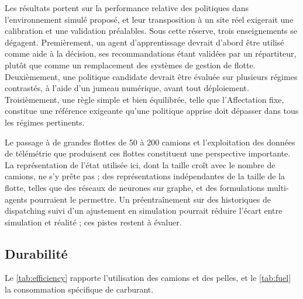 \documentclass[11pt,a4paper]{article}
\newif\ifrevmarks
\newcommand{\revtag}[1]{\ifrevmarks\textsuperscript{\textcolor{red!70!black}{\scriptsize[#1]}}\fi}
\newenvironment{revbloc}[1]{\par\ifrevmarks\color{revcolor}\noindent\revtag{#1}\ \fi}{\par}
\begin{document}
\begin{revbloc}{M27}
Les résultats portent sur la performance relative des politiques dans l'environnement simulé proposé, et leur transposition à un site réel exigerait une calibration et une validation préalables. Sous cette réserve, trois enseignements se dégagent. Premièrement, un agent d'apprentissage devrait d'abord être utilisé comme aide à la décision, ses recommandations étant validées par un répartiteur, plutôt que comme un remplacement des systèmes de gestion de flotte. Deuxièmement, une politique candidate devrait être évaluée sur plusieurs régimes contrastés, à l'aide d'un jumeau numérique, avant tout déploiement. Troisièmement, une règle simple et bien équilibrée, telle que l'Affectation fixe, constitue une référence exigeante qu'une politique apprise doit dépasser dans tous les régimes pertinents.

Le passage à de grandes flottes de 50 à 200 camions et l'exploitation des données de télémétrie que produisent ces flottes constituent une perspective importante. La représentation de l'état utilisée ici, dont la taille croît avec le nombre de camions, ne s'y prête pas ; des représentations indépendantes de la taille de la flotte, telles que des réseaux de neurones sur graphe, et des formulations multi-agents \cite{Zhao2025} pourraient le permettre. Un préentraînement sur des historiques de dispatching suivi d'un ajustement en simulation pourrait réduire l'écart entre simulation et réalité ; ces pistes restent à évaluer.
\end{revbloc}

\subsection{Durabilité}
\label{sec:sustainability}

Le \cref{tab:efficiency} rapporte l'utilisation des camions et des pelles, et le \cref{tab:fuel} la consommation spécifique de carburant.
\end{document}
